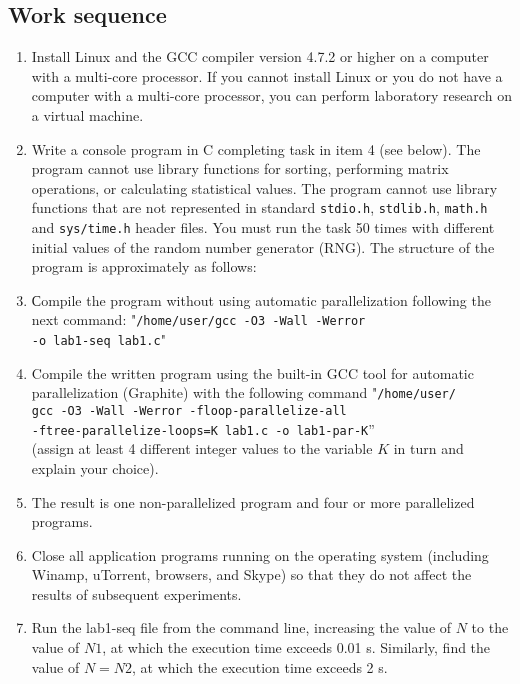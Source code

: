 { %
	\subsection{Work sequence}
	\begin{enumerate}
		\item Install Linux and the GCC compiler version 4.7.2 or higher on a computer with a multi-core processor. If you cannot install Linux or you do not have a computer with a multi-core processor, you can perform laboratory research on a virtual machine.
		\item Write a console program in C completing task in item 4 (see below). The program cannot use library functions for sorting, performing matrix operations, or calculating statistical values. The program cannot use library functions that are not represented in standard \texttt{stdio.h}, \texttt{stdlib.h}, \texttt{math.h} and \texttt{sys/time.h} header files. You must run the task 50 times with different initial values of the random number generator (RNG). The structure of the program is approximately as follows:
			\begin{figure}[H]
				
			\end{figure}
		\item Сompile the program without using automatic parallelization following the next command: "\texttt{/home/user/gcc -O3 -Wall -Werror \\-o lab1-seq lab1.c}"
		\item Compile the written program using the built-in GCC tool for automatic parallelization (Graphite) with the following command  "\texttt{/home/user/\\gcc -O3 -Wall -Werror -floop-parallelize-all \\-ftree-parallelize-loops=K lab1.c -o lab1-par-K}” \\(assign at least 4 different integer values to the variable $ K $ in turn and explain your choice).
		\item The result is one non-parallelized program and four or more parallelized programs.
		\item Close all application programs running on the operating system (including Winamp, uTorrent, browsers, and Skype) so that they do not affect the results of subsequent experiments.
		\item Run the lab1-seq file from the command line, increasing the value of $ N $ to the value of $ N1 $, at which the execution time exceeds 0.01 s. Similarly, find the value of $ N=N2 $, at which the execution time exceeds 2 s.

\end{enumerate}}
